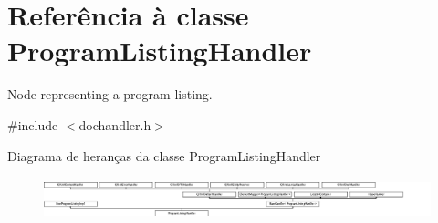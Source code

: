 \hypertarget{class_program_listing_handler}{\section{Referência à classe Program\-Listing\-Handler}
\label{class_program_listing_handler}
}


Node representing a program listing.  




{\ttfamily \#include $<$dochandler.\-h$>$}

Diagrama de heranças da classe Program\-Listing\-Handler\begin{figure}[H]
\begin{center}
\leavevmode
\includegraphics[height=1.226054cm]{class_program_listing_handler}
\end{center}
\end{figure}
